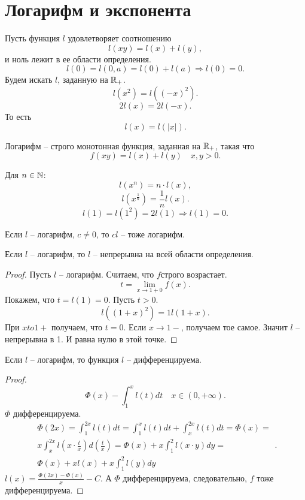 \documentclass[12pt]{report}
\begin{document}
\section{Логарифм и экспонента}
Пусть функция $ l$ удовлетворяет соотношению 
\[
    l(xy) = l(x)+l(y)
,\] 
 и ноль лежит в ее области определения.
\[
    l(0) = l(0, a) = l(0) + l(a) \Longrightarrow l(0) = 0
.\] 
Будем искать $ l$, заданную на $ \mathbb{R}_{+}$.
\[
    l(x^2) = l((-x)^2)
.\] 
\[
    2l(x) = 2 l(-x)
.\] 
То есть \[
    l(x) = l(|x|)
.\] 
\begin{defn}
    Логарифм -- строго монотонная функция, заданная на $ \mathbb{R}_{+}$, такая что \[
	f(xy) = l(x) + l(y) \quad x, y >0
    .\] 
\end{defn}
\begin{st}
    Для $ n \in  \mathbb{N}$:
    \[
	l(x^{n}) = n\cdot l(x)
    ,\] 
    \[
	l(x^{\frac{1}{n}}) = \frac{1}{n} l(x)
    .\] 
    \[
	l(1) = l(1^2) = 2 l(1) \Longrightarrow l(1) = 0
    .\] 
\end{st}
\begin{st}
    Если $ l$ -- логарифм, $ c\ne 0$, то $ cl$ -- тоже логарифм.
\end{st}
\begin{lm}
    Если $ l$ -- логарифм, то $ l$ -- непрерывна на всей области определения.
\end{lm}
\begin{proof}
    Пусть $ l$ -- логарифм. Считаем, что $ f$строго возрастает.
    \[
	t = \lim_{x \to 1 + 0} f(x) 
    .\] 
    Покажем, что $ t = l(1) = 0$.
    Пусть  $ t>0$. \[
	l((1+ x)^{2}) = 1 l(1+ x) 
    .\] 
    При $ x to 1+$ получаем, что $ t=0$.
    Если  $ x \to  1-$, получаем тое самое. Значит $l$ -- непрерывна в 1.
    И равна нулю в этой точке.
\end{proof}
\begin{lm}
    Если $ l$ -- логарифм, то функция $ l$ -- дифференцируема.
\end{lm}
\begin{proof}
    \[
	\Phi (x) - \int_1^{x}l(t) dt \quad x \in  (0, + \infty)
    .\] 
    $ \Phi$  дифференцируема.
    \[
	\begin{array}{cc}
	\Phi(2x) = \int_1^{2x} l(t) dt = \int_1^{x}  l(t) dt + \int_x^{2x}l(t) dt = \Phi(x) = \\
	x \int_x^{2x} l(x \cdot \frac{t}{x}) d(\frac{t}{x}) = \Phi (x) + x \int_1 ^{2} l(x \cdot y) dy = \\
	\Phi(x) + x l(x) + x \int_1^{2} l(y) dy
	\end{array}
    .\] 
    $ l(x) = \frac{\Phi(2x) -\Phi(x) }{x} - C$.
    А $ \Phi$  дифференцируема, следовательно, $ f$  тоже дифференцируема.
\end{proof}
\end{document}
